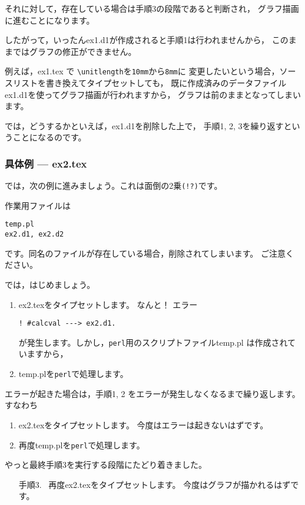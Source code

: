 \documentclass[a4j,fleqn]{jarticle}
\begin{document}
それに対して，存在している場合は手順3の段階であると判断され，
グラフ描画に進むことになります。

したがって，いったん\textsf{ex1.d1}が作成されると手順1は行われませんから，
このままではグラフの修正ができません。

例えば，ex1.tex で \verb+\unitlength+を\texttt{10mm}から\texttt{8mm}に
変更したいという場合，ソースリストを書き換えてタイプセットしても，
既に作成済みのデータファイル\textsf{ex1.d1}を使ってグラフ描画が行われますから，
グラフは前のままとなってしまいます。

では，どうするかといえば，\textsf{ex1.d1}を削除した上で，
手順1, 2, 3を繰り返すということになるのです。

\subsubsection{具体例 --- ex2.tex}
では，次の例に進みましょう。これは面倒の2乗\verb+(!?)+です。

作業用ファイルは
\begin{jquote}
\begin{verbatim}
temp.pl
ex2.d1, ex2.d2
\end{verbatim}
\end{jquote}
です。同名のファイルが存在している場合，削除されてしまいます。
ご注意ください。

では，はじめましょう。
\begin{enumerate}[手順 1.~]
  \item \textsf{ex2.tex}をタイプセットします。
    なんと！ エラー
\begin{jquote}
\begin{verbatim}
! #calcval ---> ex2.d1.
\end{verbatim}
\end{jquote}
が発生します。しかし，\texttt{perl}用のスクリプトファイル\textsf{temp.pl}
は作成されていますから，
  \item \textsf{temp.pl}を\texttt{perl}で処理します。
\end{enumerate}
エラーが起きた場合は，手順1, 2 をエラーが発生しなくなるまで繰り返します。
すなわち
\begin{enumerate}[手順 1$'$.~]
  \item \textsf{ex2.tex}をタイプセットします。
    今度はエラーは起きないはずです。
  \item 再度\textsf{temp.pl}を\texttt{perl}で処理します。
\end{enumerate}
やっと最終手順3を実行する段階にたどり着きました。
\begin{enumerate}[手順 1.~]
  \item[手順3.~] 再度{ex2.tex}をタイプセットします。
    今度はグラフが描かれるはずです。
\end{enumerate}
\end{document}

